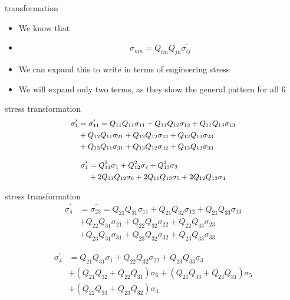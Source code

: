 \documentclass[
  letterpaper,
  ignorenonframetext,
  aspectratio=43,
  handout,
  12pt]{beamer}
\begin{document}
\begin{frame}{transformation}
\protect\hypertarget{transformation-2}{}
\begin{itemize}
\item
  We know that
\item
  \[\sigma_{mn} = Q_{im}Q_{jn} \sigma_{ij}^\prime\]
\item
  We can expand this to write in terms of engineering stress
\item
  We will expand only two terms, as they show the general pattern for
  all 6
\end{itemize}
\end{frame}

\begin{frame}{stress transformation}
\protect\hypertarget{stress-transformation}{}
\[\small{\begin{aligned}
    \sigma_{1}^\prime &= \sigma_{11}^\prime =  Q_{11}Q_{11} \sigma_{11} + Q_{11}Q_{12} \sigma_{12} + Q_{11}Q_{13}\sigma_{13}\\
    & + Q_{12}Q_{11} \sigma_{21} + Q_{12}Q_{12} \sigma_{22} + Q_{12}Q_{13}\sigma_{23}\\
    & + Q_{13}Q_{11} \sigma_{31} + Q_{13}Q_{12} \sigma_{32} + Q_{13}Q_{13}\sigma_{33}
\end{aligned}}\]

\[\small{\begin{aligned}
    \sigma_{1}^\prime &= Q_{11}^2 \sigma_{1} + Q_{12}^2 \sigma_{2} + Q_{13}^2\sigma_{3}\\
    & + 2 Q_{11}Q_{12} \sigma_{6} + 2Q_{11}Q_{13}\sigma_{5} + 2Q_{12}Q_{13}\sigma_{4}
\end{aligned}}\]
\end{frame}

\begin{frame}{stress transformation}
\protect\hypertarget{stress-transformation-1}{}
\[\begin{aligned}
 \sigma_{4}^\prime &= \sigma_{23}^\prime =  Q_{21}Q_{31} \sigma_{11} + Q_{21}Q_{32} \sigma_{12} + Q_{21}Q_{33}\sigma_{13}\\
 &+ Q_{22}Q_{31} \sigma_{21} + Q_{22}Q_{32} \sigma_{22} + Q_{22}Q_{33}\sigma_{23}\\
 &+ Q_{23}Q_{31} \sigma_{31} + Q_{23}Q_{32} \sigma_{32} + Q_{23}Q_{33}\sigma_{33}
\end{aligned}\]

\[\begin{aligned}
 \sigma_{4}^\prime &= Q_{21}Q_{31} \sigma_{1} + Q_{22}Q_{32} \sigma_{22} + Q_{23}Q_{33}\sigma_{3}\\
 &+ (Q_{21}Q_{32}+Q_{22}Q_{31}) \sigma_{6} + (Q_{21}Q_{33}+Q_{23}Q_{31})\sigma_{5}\\
 &+ (Q_{22}Q_{33}+Q_{23}Q_{32})\sigma_{4}
\end{aligned}\]
\end{frame}
\end{document}
